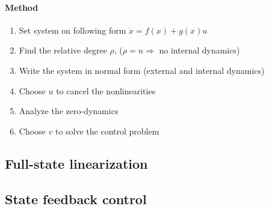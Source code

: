 \paragraph{Method}
\begin{enumerate}
	\item Set system on following form $\dot{x} = f(x) + g(x)u$
	\item Find the relative degree $\rho$, ($\rho = n \Rightarrow$ no internal dynamics)
	\item Write the system in normal form (external and internal dynamics)
	\item Choose $u$ to cancel the nonlinearities
	\item Analyze the zero-dynamics
	\item Choose $v$ to solve the control problem
\end{enumerate}

\subsection{Full-state linearization}

\subsection{State feedback control}
